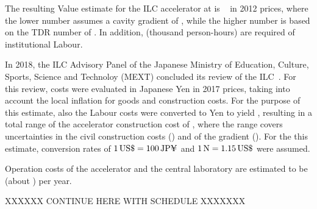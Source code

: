 The resulting Value estimate for the ILC accelerator at  is 
~\cite{Evans:2017rvt} in 2012 prices, where the lower number assumes a cavity gradient of , while the higher number is based on the TDR number of . 
In addition,  (thousand person-hours) are required of institutional Labour.

In 2018, the ILC Advisory Panel of the Japanese Ministry of Education, Culture, Sports, Science and Technoloy (MEXT) concluded its review of the ILC~\cite{ILCAP:2018}. 
For this review, costs were evaluated in Japanese Yen in 2017 prices, taking into account the local inflation for goods and construction costs.
For the purpose of this estimate, also the Labour costs were converted to Yen to yield , resulting in a total range of the accelerator construction cost of , where the range covers uncertainties in the civil construction costs () and of the gradient ().
For the this estimate, conversion rates of $\siunit{1}{US\$} = \siunit{100}{JP\yen}$ and $\siunit{1}{\euro} = \siunit{1.15}{US\$}$ were assumed.

Operation costs of the accelerator and the central laboratory are estimated to be  (about ) per year.



XXXXXX CONTINUE HERE WITH SCHEDULE   XXXXXXX












